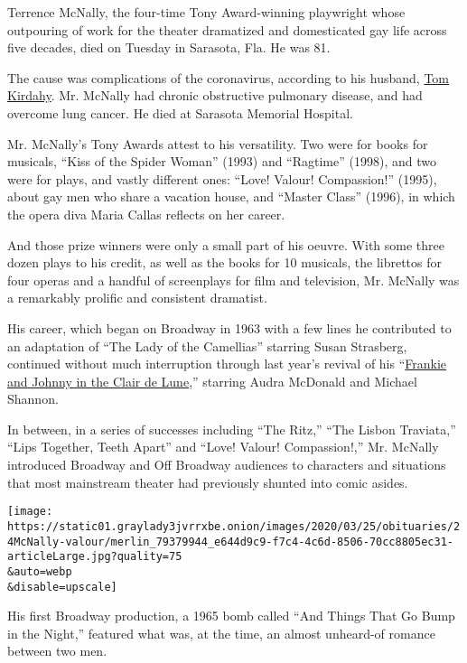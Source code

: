 Terrence McNally, the four-time Tony Award-winning playwright whose
outpouring of work for the theater dramatized and domesticated gay life
across five decades, died on Tuesday in Sarasota, Fla. He was 81.

The cause was complications of the coronavirus, according to his
husband,
\href{https://www.nytimes3xbfgragh.onion/2017/11/15/fashion/weddings/tom-kirdahy-and-terrence-mcnally-an-immediate-and-lasting-need.html}{Tom
Kirdahy}. Mr. McNally had chronic obstructive pulmonary disease, and had
overcome lung cancer. He died at Sarasota Memorial Hospital.

Mr. McNally's Tony Awards attest to his versatility. Two were for books
for musicals, ``Kiss of the Spider Woman'' (1993) and ``Ragtime''
(1998), and two were for plays, and vastly different ones: ``Love!
Valour! Compassion!'' (1995), about gay men who share a vacation house,
and ``Master Class'' (1996), in which the opera diva Maria Callas
reflects on her career.

And those prize winners were only a small part of his oeuvre. With some
three dozen plays to his credit, as well as the books for 10 musicals,
the librettos for four operas and a handful of screenplays for film and
television, Mr. McNally was a remarkably prolific and consistent
dramatist.

His career, which began on Broadway in 1963 with a few lines he
contributed to an adaptation of ``The Lady of the Camellias'' starring
Susan Strasberg, continued without much interruption through last year's
revival of his
``\href{https://www.nytimes3xbfgragh.onion/2019/05/30/theater/frankie-and-johnny-review-audra-mcdonald.html}{Frankie
and Johnny in the Clair de Lune},'' starring Audra McDonald and Michael
Shannon.

In between, in a series of successes including ``The Ritz,'' ``The
Lisbon Traviata,'' ``Lips Together, Teeth Apart'' and ``Love! Valour!
Compassion!,'' Mr. McNally introduced Broadway and Off Broadway
audiences to characters and situations that most mainstream theater had
previously shunted into comic asides.

\texttt{[image: https://static01.graylady3jvrrxbe.onion/images/2020/03/25/obituaries/24McNally-valour/merlin\_79379944\_e644d9c9-f7c4-4c6d-8506-70cc8805ec31-articleLarge.jpg?quality=75\\\&auto=webp\\\&disable=upscale]}

His first Broadway production, a 1965 bomb called ``And Things That Go
Bump in the Night,'' featured what was, at the time, an almost
unheard-of romance between two men.

